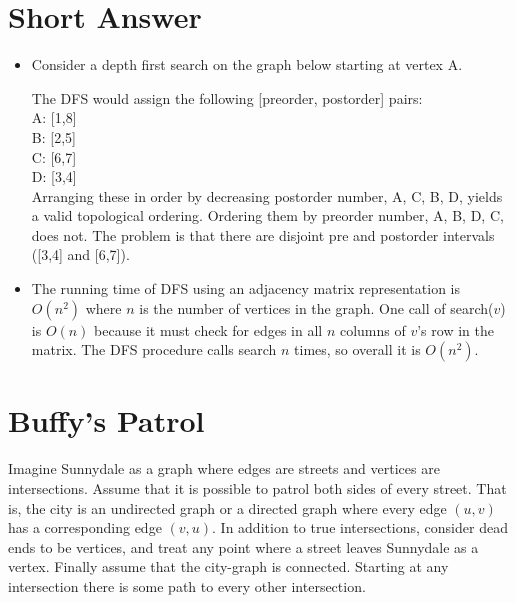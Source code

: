 \documentclass[11pt]{article}
\begin{document}
\section{Short Answer}
\begin{itemize}
\item{
Consider a depth first search on the graph below starting at vertex A. \\

The DFS would assign the following [preorder, postorder] pairs: \\
A: [1,8] \\
B: [2,5] \\
C: [6,7] \\
D: [3,4] \\
Arranging these in order by decreasing postorder number, A, C, B, D, yields a valid topological ordering. Ordering them by preorder number, A, B, D, C, does not. The problem is that there are disjoint pre and postorder intervals ([3,4] and [6,7]).
}

\item{
The running time of DFS using an adjacency matrix representation is $O(n^2)$ where $n$ is the number of vertices in the graph. One call of search($v$) is $O(n)$ because it must check for edges in all $n$ columns of $v$'s row in the matrix. The DFS procedure calls search $n$ times, so overall it is $O(n^2)$.
}

\end{itemize}

\section{Buffy's Patrol}

\par{Imagine Sunnydale as a graph where edges are streets and vertices are intersections. Assume that it is possible to patrol both sides of every street. That is, the city is an undirected graph or a directed graph where every edge $(u,v)$ has a corresponding edge $(v,u)$. In addition to true intersections, consider dead ends to be vertices, and treat any point where a street leaves Sunnydale as a vertex. Finally assume that the city-graph is connected. Starting at any intersection there is some path to every other intersection.}
\end{document}
